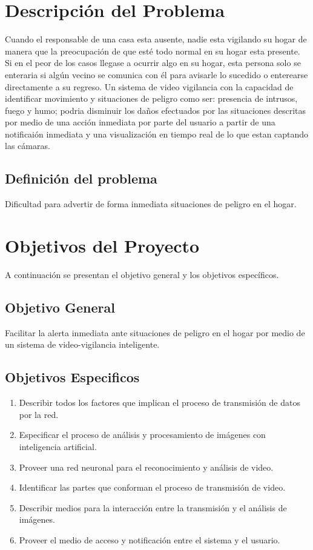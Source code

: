 \section{Descripción del Problema}
Cuando el responsable de una casa esta ausente, nadie esta vigilando su hogar de manera que la preocupación de que esté todo normal en su hogar esta presente. Si en el peor de los casos llegase a ocurrir algo en su hogar, esta persona solo se enteraria si algún vecino se comunica con él para avisarle lo sucedido o enterearse directamente a su regreso. Un sistema de video vigilancia con la capacidad de identificar movimiento y situaciones de peligro como ser: presencia de intrusos, fuego y humo; podria disminuir los daños efectuados por las situaciones descritas por medio de una acción inmediata por parte del usuario a partir de una notificaión inmediata y una visualización en tiempo real de lo que estan captando las cámaras.\

\subsection{Definición del problema}
Dificultad para advertir de forma inmediata situaciones de peligro en el hogar.

\section{Objetivos del Proyecto}
A continuación se presentan el objetivo general y los objetivos específicos.

\subsection{Objetivo General}
Facilitar la alerta inmediata ante situaciones de peligro en el hogar por medio de un sistema de video-vigilancia inteligente.

\subsection{Objetivos Especificos}
\begin{enumerate}
    \item Describir todos los factores que implican el proceso de transmisión de datos por la red.
    \item Especificar el proceso de análisis y procesamiento de imágenes con inteligencia artificial.
    \item Proveer una red neuronal para el reconocimiento y análisis de video.
    \item Identificar las partes que conforman el proceso de transmisión de video.
    \item Describir medios para la interacción entre la transmisión y el análisis de imágenes.
    \item Proveer el medio de acceso y notificación entre el sistema y el usuario.
\end{enumerate}


